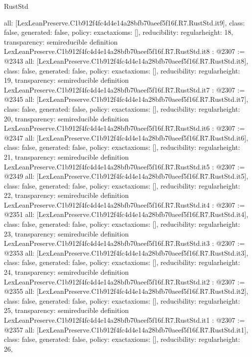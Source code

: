 \begin{lexlean}{RustStd}
\begin{coremodule}
{  all: [LexLeanPreserve.C1b912f4fc4d4e14a28bfb70aeef5f16f.R7.RustStd.it9],
  class: false,
  generated: false,
  policy: exact{axioms: []},
  reducibility: regular{height: 18},
  transparency: semireducible
}
definition LexLeanPreserve.C1b912f4fc4d4e14a28bfb70aeef5f16f.R7.RustStd.it8 : @2307 := @2343 {
  all: [LexLeanPreserve.C1b912f4fc4d4e14a28bfb70aeef5f16f.R7.RustStd.it8],
  class: false,
  generated: false,
  policy: exact{axioms: []},
  reducibility: regular{height: 19},
  transparency: semireducible
}
definition LexLeanPreserve.C1b912f4fc4d4e14a28bfb70aeef5f16f.R7.RustStd.it7 : @2307 := @2345 {
  all: [LexLeanPreserve.C1b912f4fc4d4e14a28bfb70aeef5f16f.R7.RustStd.it7],
  class: false,
  generated: false,
  policy: exact{axioms: []},
  reducibility: regular{height: 20},
  transparency: semireducible
}
definition LexLeanPreserve.C1b912f4fc4d4e14a28bfb70aeef5f16f.R7.RustStd.it6 : @2307 := @2347 {
  all: [LexLeanPreserve.C1b912f4fc4d4e14a28bfb70aeef5f16f.R7.RustStd.it6],
  class: false,
  generated: false,
  policy: exact{axioms: []},
  reducibility: regular{height: 21},
  transparency: semireducible
}
definition LexLeanPreserve.C1b912f4fc4d4e14a28bfb70aeef5f16f.R7.RustStd.it5 : @2307 := @2349 {
  all: [LexLeanPreserve.C1b912f4fc4d4e14a28bfb70aeef5f16f.R7.RustStd.it5],
  class: false,
  generated: false,
  policy: exact{axioms: []},
  reducibility: regular{height: 22},
  transparency: semireducible
}
definition LexLeanPreserve.C1b912f4fc4d4e14a28bfb70aeef5f16f.R7.RustStd.it4 : @2307 := @2351 {
  all: [LexLeanPreserve.C1b912f4fc4d4e14a28bfb70aeef5f16f.R7.RustStd.it4],
  class: false,
  generated: false,
  policy: exact{axioms: []},
  reducibility: regular{height: 23},
  transparency: semireducible
}
definition LexLeanPreserve.C1b912f4fc4d4e14a28bfb70aeef5f16f.R7.RustStd.it3 : @2307 := @2353 {
  all: [LexLeanPreserve.C1b912f4fc4d4e14a28bfb70aeef5f16f.R7.RustStd.it3],
  class: false,
  generated: false,
  policy: exact{axioms: []},
  reducibility: regular{height: 24},
  transparency: semireducible
}
definition LexLeanPreserve.C1b912f4fc4d4e14a28bfb70aeef5f16f.R7.RustStd.it2 : @2307 := @2355 {
  all: [LexLeanPreserve.C1b912f4fc4d4e14a28bfb70aeef5f16f.R7.RustStd.it2],
  class: false,
  generated: false,
  policy: exact{axioms: []},
  reducibility: regular{height: 25},
  transparency: semireducible
}
definition LexLeanPreserve.C1b912f4fc4d4e14a28bfb70aeef5f16f.R7.RustStd.it1 : @2307 := @2357 {
  all: [LexLeanPreserve.C1b912f4fc4d4e14a28bfb70aeef5f16f.R7.RustStd.it1],
  class: false,
  generated: false,
  policy: exact{axioms: []},
  reducibility: regular{height: 26},
}
\end{coremodule}
\end{lexlean}
